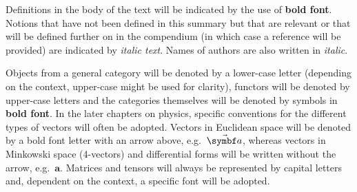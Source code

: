 \documentclass[12pt, a4paper]{report}
\begin{document}
   Definitions in the body of the text will be indicated by the use of \textbf{bold font}. Notions that have not been defined in this summary but that are relevant or that will be defined further on in the compendium (in which case a reference will be provided) are indicated by \textit{italic text}. Names of authors are also written in \textit{italic}.

   Objects from a general category will be denoted by a lower-case letter (depending on the context, upper-case might be used for clarity), functors will be denoted by upper-case letters and the categories themselves will be denoted by symbols in \textbf{bold font}. In the later chapters on physics, specific conventions for the different types of vectors will often be adopted. Vectors in Euclidean space will be denoted by a bold font letter with an arrow above, e.g.~$\vector{a}$, whereas vectors in Minkowski space (4-vectors) and differential forms will be written without the arrow, e.g.~$\symbf{a}$. Matrices and tensors will always be represented by capital letters and, dependent on the context, a specific font will be adopted.


% 
% 
% 
% 
% 


% 
% 
% 
% 
% 


% 
% 
% 
% 

\end{document}
